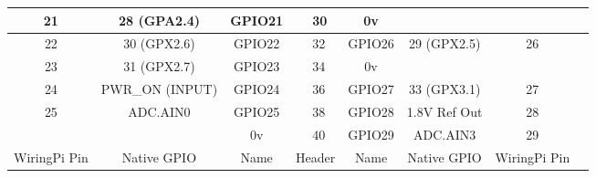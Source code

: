 \documentclass[11pt,a4paper]{article}
\begin{document}
\begin{sffamily}
\begin{center}
\begin{tabular}{|c|c|c||p{8mm}|p{8mm}||c|c|c|c|}
\hline
21	& 28 (GPA2.4)		& \textcolor{rtb-green}{GPIO21}	& \raggedleft{29} & 30 & \textcolor{rtb-black}{0v}		&				& \\
\hline
22	& 30 (GPX2.6)		& \textcolor{rtb-green}{GPIO22}	& \raggedleft{31} & 32 & \textcolor{rtb-green}{GPIO26}	& 29 (GPX2.5)	& 26\\
\hline
23	& 31 (GPX2.7)		& \textcolor{rtb-green}{GPIO23}	& \raggedleft{33} & 34 & \textcolor{rtb-black}{0v}		&				& \\
\hline
24	& PWR{\_}ON (INPUT)	& \textcolor{rtb-green}{GPIO24}	& \raggedleft{35} & 36 & \textcolor{rtb-green}{GPIO27}	& 33 (GPX3.1)	& 27\\
\hline
25	& ADC.AIN0			& \textcolor{rtb-green}{GPIO25}	& \raggedleft{37} & 38 & \textcolor{rtb-green}{GPIO28}	& 1.8V Ref Out	& 28\\
\hline
	& 					& \textcolor{rtb-black}{0v}		& \raggedleft{39} & 40 & \textcolor{rtb-green}{GPIO29}	& ADC.AIN3		& 29\\
\hline
\hline
WiringPi Pin	& Native GPIO	& Name	& \multicolumn{2}{|c||}{Header}	& Name	& Native GPIO	& WiringPi Pin\\
\hline
\end{tabular}
\end{center}

\end{sffamily}
\end{document}
